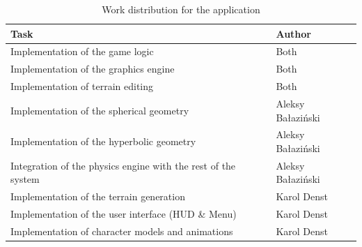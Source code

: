 \begin{table}[!htb]
    \centering
    \begin{tabular}{|l|l|}
        \hline
        Task                                                          & Author            \\ \hline
        Implementation of the game logic                              & Both              \\
        Implementation of the graphics engine                         & Both              \\
        Implementation of terrain editing                             & Both              \\
        Implementation of the spherical geometry                      & Aleksy Bałaziński \\
        Implementation of the hyperbolic geometry                     & Aleksy Bałaziński \\
        Integration of the physics engine with the rest of the system & Aleksy Bałaziński \\
        Implementation of the terrain generation                      & Karol Denst       \\
        Implementation of the user interface (HUD \& Menu)            & Karol Denst       \\
        Implementation of character models and animations             & Karol Denst       \\
        \hline
    \end{tabular}
    \caption{Work distribution for the application}
    \label{tab:division_of_work_on_the_application}
\end{table}

